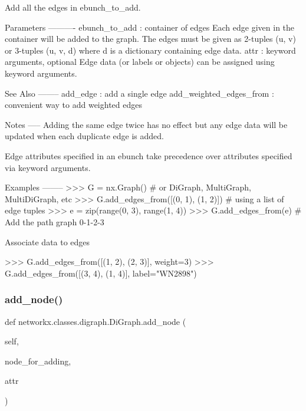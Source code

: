 \begin{DoxyVerb}Add all the edges in ebunch_to_add.

Parameters
----------
ebunch_to_add : container of edges
    Each edge given in the container will be added to the
    graph. The edges must be given as 2-tuples (u, v) or
    3-tuples (u, v, d) where d is a dictionary containing edge data.
attr : keyword arguments, optional
    Edge data (or labels or objects) can be assigned using
    keyword arguments.

See Also
--------
add_edge : add a single edge
add_weighted_edges_from : convenient way to add weighted edges

Notes
-----
Adding the same edge twice has no effect but any edge data
will be updated when each duplicate edge is added.

Edge attributes specified in an ebunch take precedence over
attributes specified via keyword arguments.

Examples
--------
>>> G = nx.Graph()  # or DiGraph, MultiGraph, MultiDiGraph, etc
>>> G.add_edges_from([(0, 1), (1, 2)])  # using a list of edge tuples
>>> e = zip(range(0, 3), range(1, 4))
>>> G.add_edges_from(e)  # Add the path graph 0-1-2-3

Associate data to edges

>>> G.add_edges_from([(1, 2), (2, 3)], weight=3)
>>> G.add_edges_from([(3, 4), (1, 4)], label="WN2898")
\end{DoxyVerb}
 \mbox{\label{classnetworkx_1_1classes_1_1digraph_1_1DiGraph_a449f037ac6d92569e66dbce5eefda8c3}} 
\subsubsection{\texorpdfstring{add\+\_\+node()}{add\_node()}}
{\footnotesize\ttfamily def networkx.\+classes.\+digraph.\+Di\+Graph.\+add\+\_\+node (\begin{DoxyParamCaption}\item[{}]{self,  }\item[{}]{node\+\_\+for\+\_\+adding,  }\item[{}]{attr }\end{DoxyParamCaption})}

